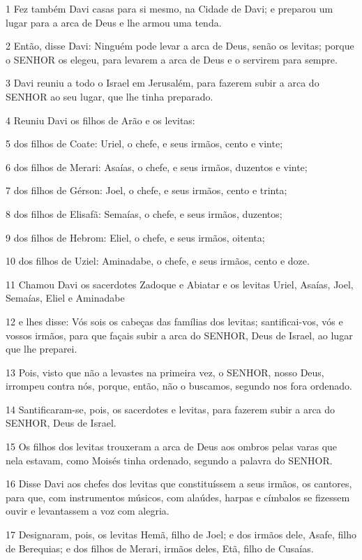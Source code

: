 \par 1 Fez também Davi casas para si mesmo, na Cidade de Davi; e preparou um lugar para a arca de Deus e lhe armou uma tenda.
\par 2 Então, disse Davi: Ninguém pode levar a arca de Deus, senão os levitas; porque o SENHOR os elegeu, para levarem a arca de Deus e o servirem para sempre.
\par 3 Davi reuniu a todo o Israel em Jerusalém, para fazerem subir a arca do SENHOR ao seu lugar, que lhe tinha preparado.
\par 4 Reuniu Davi os filhos de Arão e os levitas:
\par 5 dos filhos de Coate: Uriel, o chefe, e seus irmãos, cento e vinte;
\par 6 dos filhos de Merari: Asaías, o chefe, e seus irmãos, duzentos e vinte;
\par 7 dos filhos de Gérson: Joel, o chefe, e seus irmãos, cento e trinta;
\par 8 dos filhos de Elisafã: Semaías, o chefe, e seus irmãos, duzentos;
\par 9 dos filhos de Hebrom: Eliel, o chefe, e seus irmãos, oitenta;
\par 10 dos filhos de Uziel: Aminadabe, o chefe, e seus irmãos, cento e doze.
\par 11 Chamou Davi os sacerdotes Zadoque e Abiatar e os levitas Uriel, Asaías, Joel, Semaías, Eliel e Aminadabe
\par 12 e lhes disse: Vós sois os cabeças das famílias dos levitas; santificai-vos, vós e vossos irmãos, para que façais subir a arca do SENHOR, Deus de Israel, ao lugar que lhe preparei.
\par 13 Pois, visto que não a levastes na primeira vez, o SENHOR, nosso Deus, irrompeu contra nós, porque, então, não o buscamos, segundo nos fora ordenado.
\par 14 Santificaram-se, pois, os sacerdotes e levitas, para fazerem subir a arca do SENHOR, Deus de Israel.
\par 15 Os filhos dos levitas trouxeram a arca de Deus aos ombros pelas varas que nela estavam, como Moisés tinha ordenado, segundo a palavra do SENHOR.
\par 16 Disse Davi aos chefes dos levitas que constituíssem a seus irmãos, os cantores, para que, com instrumentos músicos, com alaúdes, harpas e címbalos se fizessem ouvir e levantassem a voz com alegria.
\par 17 Designaram, pois, os levitas Hemã, filho de Joel; e dos irmãos dele, Asafe, filho de Berequias; e dos filhos de Merari, irmãos deles, Etã, filho de Cusaías.
